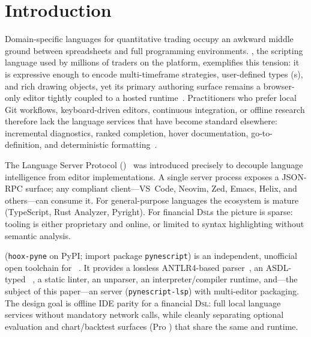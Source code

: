 \documentclass[11pt,a4paper]{article}
\begin{document}
\section{Introduction}
\label{sec:intro}

Domain-specific languages for quantitative trading occupy an awkward middle ground
between spreadsheets and full programming environments. \pine{}, the scripting language
used by millions of traders on the \tv{} platform, exemplifies this tension: it is
expressive enough to encode multi-timeframe strategies, user-defined types (\udt{}s),
and rich drawing objects, yet its primary authoring surface remains a browser-only
editor tightly coupled to a hosted runtime~\citep{tradingview-pine,fowler2010dsl}.
Practitioners who prefer local Git workflows, keyboard-driven editors, continuous
integration, or offline research therefore lack the language services that have become
standard elsewhere: incremental diagnostics, ranked completion, hover documentation,
go-to-definition, and deterministic formatting~\citep{lsp2023,voutilainen2016lsp}.

The Language Server Protocol (\lsp{})~\citep{lsp2023} was introduced precisely to
decouple language intelligence from editor implementations. A single server process
exposes a JSON-RPC surface; any compliant client---VS~Code, Neovim, Zed, Emacs, Helix,
and others---can consume it. For general-purpose languages the ecosystem is mature
(TypeScript, Rust Analyzer, Pyright). For financial \textsc{Dsl}s the picture is
sparse: tooling is either proprietary and online, or limited to syntax highlighting
without semantic analysis.

\pyne{} (\texttt{hoox-pyne} on PyPI; import package \texttt{pynescript}) is an
independent, unofficial open toolchain for \pine{}~\citep{pynescript2026,hoox2026}.
It provides a lossless ANTLR4-based parser~\citep{parr2013antlr}, an ASDL-typed
\ast{}~\citep{wang1997asdl}, a static linter, an unparser, an interpreter/compiler
runtime, and---the subject of this paper---an \lsp{} server
(\texttt{pynescript-lsp}) with multi-editor packaging. The design goal is offline IDE
parity for a financial \textsc{Dsl}: full local language services without mandatory
network calls, while cleanly separating optional evaluation and chart/backtest
surfaces (Pro \api{}) that share the same \ast{} and runtime.
\end{document}

